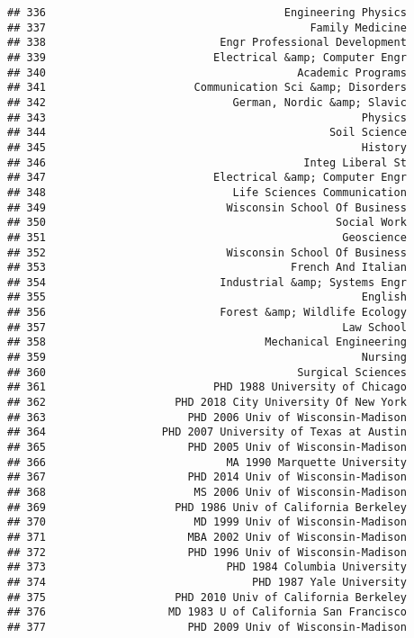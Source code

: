 \documentclass[
]{article}
\begin{document}
\begin{verbatim}
## 336                                     Engineering Physics
## 337                                         Family Medicine
## 338                           Engr Professional Development
## 339                          Electrical &amp; Computer Engr
## 340                                       Academic Programs
## 341                       Communication Sci &amp; Disorders
## 342                             German, Nordic &amp; Slavic
## 343                                                 Physics
## 344                                            Soil Science
## 345                                                 History
## 346                                        Integ Liberal St
## 347                          Electrical &amp; Computer Engr
## 348                             Life Sciences Communication
## 349                            Wisconsin School Of Business
## 350                                             Social Work
## 351                                              Geoscience
## 352                            Wisconsin School Of Business
## 353                                      French And Italian
## 354                           Industrial &amp; Systems Engr
## 355                                                 English
## 356                           Forest &amp; Wildlife Ecology
## 357                                              Law School
## 358                                  Mechanical Engineering
## 359                                                 Nursing
## 360                                       Surgical Sciences
## 361                          PHD 1988 University of Chicago
## 362                    PHD 2018 City University Of New York
## 363                      PHD 2006 Univ of Wisconsin-Madison
## 364                  PHD 2007 University of Texas at Austin
## 365                      PHD 2005 Univ of Wisconsin-Madison
## 366                            MA 1990 Marquette University
## 367                      PHD 2014 Univ of Wisconsin-Madison
## 368                       MS 2006 Univ of Wisconsin-Madison
## 369                    PHD 1986 Univ of California Berkeley
## 370                       MD 1999 Univ of Wisconsin-Madison
## 371                      MBA 2002 Univ of Wisconsin-Madison
## 372                      PHD 1996 Univ of Wisconsin-Madison
## 373                            PHD 1984 Columbia University
## 374                                PHD 1987 Yale University
## 375                    PHD 2010 Univ of California Berkeley
## 376                   MD 1983 U of California San Francisco
## 377                      PHD 2009 Univ of Wisconsin-Madison

\end{verbatim}
\end{document}
